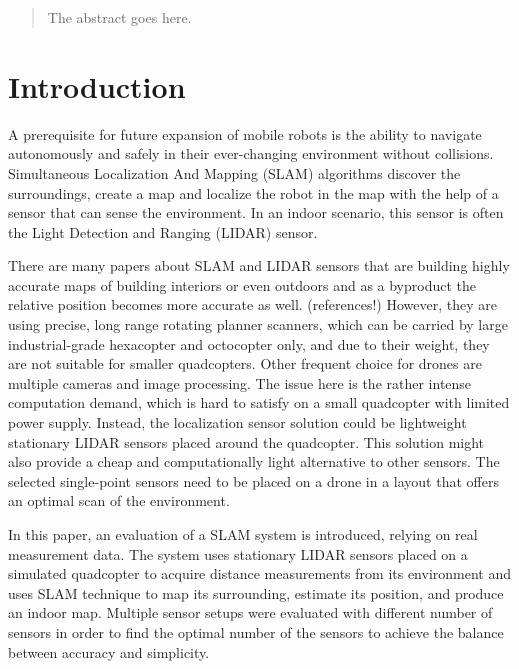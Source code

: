 \documentclass[conference]{IEEEtran}
\begin{document}
\begin{abstract}
The abstract goes here.
\end{abstract}



%
\IEEEpeerreviewmaketitle



\section{Introduction}
A prerequisite for future expansion of mobile robots is the ability to navigate autonomously and safely in their ever-changing environment without collisions. Simultaneous Localization And Mapping (SLAM) algorithms discover the surroundings, create a map and localize the robot in the map with the help of a sensor that can sense the environment. In an indoor scenario, this sensor is often the Light Detection and Ranging (LIDAR) sensor. 

There are many papers about SLAM and LIDAR sensors that are building highly accurate maps of building interiors or even outdoors and as a byproduct the relative position becomes more accurate as well. (references!) However, they are using precise, long range rotating planner scanners, which can be carried by large industrial-grade hexacopter and octocopter only, and due to their weight, they are not suitable for smaller quadcopters. Other frequent choice for drones are multiple cameras and image processing. The issue here is the rather intense computation demand, which is hard to satisfy on a small quadcopter with limited power supply. Instead, the localization sensor solution could be lightweight stationary LIDAR sensors placed around the quadcopter. This solution might also provide a cheap and computationally light alternative to other sensors. The selected single-point sensors need to be placed on a drone in a layout that offers an optimal scan of the environment. 

In this paper, an evaluation of a SLAM system is introduced, relying on real measurement data. The system uses stationary LIDAR sensors placed on a simulated quadcopter to acquire distance measurements from its environment and uses SLAM technique to map its surrounding, estimate its position, and produce an indoor map. Multiple sensor setups were evaluated with different number of sensors in order to find the optimal number of the sensors to achieve the balance between accuracy and simplicity. 
\end{document}
